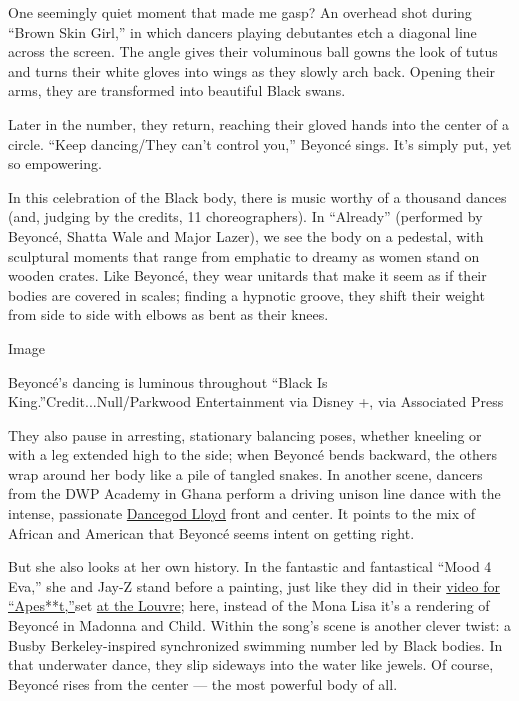 One seemingly quiet moment that made me gasp? An overhead shot during
``Brown Skin Girl,'' in which dancers playing debutantes etch a diagonal
line across the screen. The angle gives their voluminous ball gowns the
look of tutus and turns their white gloves into wings as they slowly
arch back. Opening their arms, they are transformed into beautiful Black
swans.

Later in the number, they return, reaching their gloved hands into the
center of a circle. ``Keep dancing/They can't control you,'' Beyoncé
sings. It's simply put, yet so empowering.

In this celebration of the Black body, there is music worthy of a
thousand dances (and, judging by the credits, 11 choreographers). In
``Already'' (performed by Beyoncé, Shatta Wale and Major Lazer), we see
the body on a pedestal, with sculptural moments that range from emphatic
to dreamy as women stand on wooden crates. Like Beyoncé, they wear
unitards that make it seem as if their bodies are covered in scales;
finding a hypnotic groove, they shift their weight from side to side
with elbows as bent as their knees.

Image

Beyoncé's dancing is luminous throughout ``Black Is
King.''Credit...Null/Parkwood Entertainment via Disney +, via Associated
Press

They also pause in arresting, stationary balancing poses, whether
kneeling or with a leg extended high to the side; when Beyoncé bends
backward, the others wrap around her body like a pile of tangled snakes.
In another scene, dancers from the DWP Academy in Ghana perform a
driving unison line dance with the intense, passionate
\href{https://www.instagram.com/p/CDTRa6wByKt/}{Dancegod Lloyd} front
and center. It points to the mix of African and American that Beyoncé
seems intent on getting right.

But she also looks at her own history. In the fantastic and fantastical
``Mood 4 Eva,'' she and Jay-Z stand before a painting, just like they
did in their \href{https://www.youtube.com/watch?v=kbMqWXnpXcA}{video
for ``Apes**t,''}set
\href{https://www.nytimes.com/2018/06/17/arts/design/louvre-jay-z-beyonce-video.html}{at
the Louvre}; here, instead of the Mona Lisa it's a rendering of Beyoncé
in Madonna and Child. Within the song's scene is another clever twist: a
Busby Berkeley-inspired synchronized swimming number led by Black
bodies. In that underwater dance, they slip sideways into the water like
jewels. Of course, Beyoncé rises from the center --- the most powerful
body of all.

